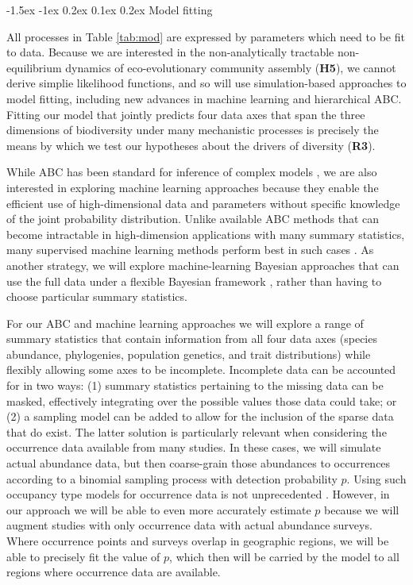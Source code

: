 \documentclass[11pt]{article}
\makeatletter
\renewcommand\subsubsection{\@startsection{subsection}{1}{\z@}%
                                  {-1.5ex \@plus -1ex \@minus 0.2ex}%
                                  {0.1ex \@plus 0.2ex}%
                                  {\normalfont\bfseries}}
\makeatother
\begin{document}
\subsubsection{Model fitting}\label{model-fitting}

All processes in Table \ref{tab:mod} are expressed by parameters which
need to be fit to data. Because we are interested in the
non-analytically tractable non-equilibrium dynamics of
eco-evolutionary community assembly (\textbf{H5}), we cannot derive
simplie likelihood functions, and so will use simulation-based
approaches to model fitting, including new advances in machine
learning and hierarchical ABC. Fitting our model that jointly predicts
four data axes that span the three dimensions of biodiversity under
many mechanistic processes is precisely the means by which we test our
hypotheses about the drivers of diversity (\textbf{R3}).

While ABC has been standard for inference of complex models
\cite{Beaumont2010-si}, we are also interested in exploring machine
learning approaches because they enable the efficient use of
high-dimensional data and parameters without specific knowledge of the
joint probability distribution. Unlike available ABC methods that can
become intractable in high-dimension applications with many summary
statistics, many supervised machine learning methods perform best in
such cases \cite{Anderson2014-fi,Breiman2001-ux}. As another strategy,
we will explore machine-learning Bayesian approaches that can use the
full data under a flexible Bayesian framework \cite{Chan2018-qh}, rather
than having to choose particular summary statistics.

For our ABC and machine learning approaches we will explore a range of
summary statistics that contain information from all four data axes
(species abundance, phylogenies, population genetics, and trait
distributions) while flexibly allowing some axes to be incomplete.
Incomplete data can be accounted for in two ways: (1) summary statistics
pertaining to the missing data can be masked, effectively integrating
over the possible values those data could take; or (2) a sampling model
can be added to allow for the inclusion of the sparse data that do
exist. The latter solution is particularly relevant when considering the
occurrence data available from many studies. In these cases, we will
simulate actual abundance data, but then coarse-grain those abundances
to occurrences according to a binomial sampling process with detection
probability $p$. Using such occupancy type models for occurrence data
is not unprecedented \cite{Tingley2009-kt}. However, in our approach we
will be able to even more accurately estimate $p$ because we will
augment studies with only occurrence data with actual abundance surveys.
Where occurrence points and surveys overlap in geographic regions, we
will be able to precisely fit the value of $p$, which then will be
carried by the model to all regions where occurrence data are available.
\end{document}
